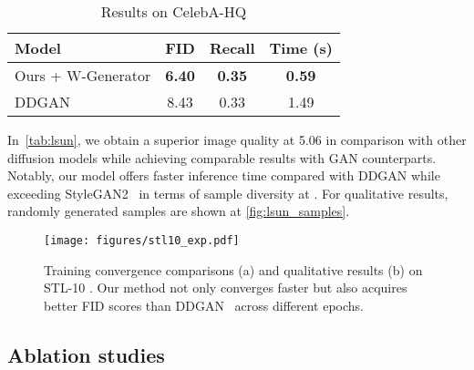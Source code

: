 \documentclass[10pt,twocolumn,letterpaper]{article}
\newcommand{\minisection}[1]{\vspace{2mm}\noindent{\textbf{#1}}}
\begin{document}
\begin{table}[t]
  \centering
    
  \begin{tabular}{l c c c}
    \toprule
    Model & FID & Recall & Time (s) \\
    \midrule
    Ours + W-Generator & \textbf{6.40} & \textbf{0.35} & \textbf{0.59} \\
    DDGAN \cite{xiao2021tackling} & 8.43 & 0.33 & 1.49 \\
    \bottomrule
  \end{tabular}
    \vspace{-2mm}
  \caption{Results on CelebA-HQ }
  \label{tab:celeba512}
    \vspace{-2mm}
\end{table}

\minisection{LSUN-Church}
In~\cref{tab:lsun}, we obtain a superior image quality at 5.06 in comparison with other diffusion models while achieving comparable results with GAN counterparts. Notably, our model offers  faster inference time compared with DDGAN while exceeding StyleGAN2~\cite{karras2020training} in terms of sample diversity at . For qualitative results, randomly generated samples are shown at \cref{fig:lsun_samples}.






























\begin{figure*}[t]
  \centering
\texttt{[image: figures/stl10\_exp.pdf]}
   \vspace{-3mm}
   \caption{Training convergence comparisons (a) and qualitative results (b) on STL-10 . Our method not only converges faster but also acquires better FID scores than DDGAN~\cite{xiao2021tackling} across different epochs.}
   \label{fig:stl10}
    \vspace{-1mm}
\end{figure*}



\subsection{Ablation studies}
\end{document}
